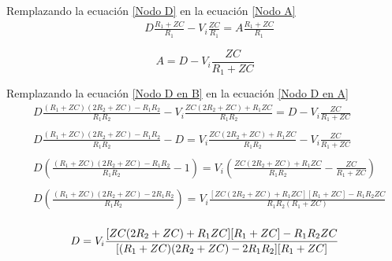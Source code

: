     Remplazando la ecuación \ref{Nodo D} en la ecuación \ref{Nodo A}
    \begin{align*}
        &D\frac{R_{1}+ZC}{R_{1}} - V_{i}\frac{ZC}{R_{1}} = A\frac{R_{1}+ZC}{R_{1}} \\\\
    \end{align*}
    \begin{equation}\label{Nodo D en A}
        A = D - V_{i}\frac{ZC}{R_{1}+ZC}
    \end{equation}
    
    Remplazando la ecuación \ref{Nodo D en B} en la ecuación \ref{Nodo D en A}
    \begin{align*}
        &D\frac{ (R_{1}+ZC)(2R_{2}+ZC) - R_{1}R_{2} }{ R_{1}R_{2}} - V_{i}\frac{ ZC(2R_{2}+ZC)+ R_{1}ZC }{ R_{1}R_{2}} = D - V_{i}\frac{ZC}{R_{1}+ZC} \\\\
        &D\frac{ (R_{1}+ZC)(2R_{2}+ZC) -  R_{1}R_{2} }{ R_{1}R_{2}} - D = V_{i}\frac{ ZC(2R_{2}+ZC)+ R_{1}ZC }{ R_{1}R_{2}} - V_{i}\frac{ZC}{R_{1}+ZC} \\\\
        &D(\frac{ (R_{1}+ZC)(2R_{2}+ZC) -  R_{1}R_{2} }{ R_{1}R_{2} } - 1) = V_{i}(\frac{ ZC(2R_{2}+ZC)+ R_{1}ZC }{ R_{1}R_{2}} - \frac{ZC}{R_{1}+ZC}) \\\\
        &D(\frac{ (R_{1}+ZC)(2R_{2}+ZC) -  2R_{1}R_{2} }{ R_{1}R_{2} }) = V_{i}\frac{ [ZC(2R_{2}+ZC)+ R_{1}ZC][R_{1}+ZC] - R_{1}R_{2}ZC }{ R_{1}R_{2}(R_{1}+ZC)} \\\\
    \end{align*}
    \begin{equation}\label{Final D en funcion de Vi}
        D = V_{i}\frac{ [ZC(2R_{2}+ZC)+ R_{1}ZC][R_{1}+ZC] - R_{1}R_{2}ZC }{ [(R_{1}+ZC)(2R_{2}+ZC) -  2R_{1}R_{2}][R_{1}+ZC]} \\\\
    \end{equation}
    
